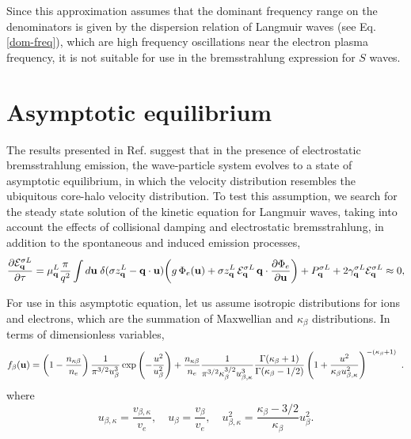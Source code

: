 \documentclass[12pt,a4paper,ruledheader]{report}
\begin{document}
\begin{appendix}
Since this approximation assumes that the dominant frequency range on
the denominators is given by the dispersion relation of Langmuir waves
(see Eq. \eqref{dom-freq}), which are high frequency oscillations
near the electron plasma frequency, it is not suitable for use in
the bremsstrahlung expression for $S$ waves.


\chapter{Asymptotic equilibrium}
\label{appB}
The results presented in Ref. \cite{Tigik2017a} suggest that in the presence
of electrostatic bremsstrahlung emission, the wave-particle system evolves to
a state of asymptotic equilibrium, in which the velocity distribution resembles
the ubiquitous core-halo velocity distribution. To test this assumption, we
search for the steady state solution of the kinetic equation for Langmuir waves,
taking into account the effects of collisional damping and electrostatic
bremsstrahlung, in addition to the spontaneous and induced emission processes,
\begin{equation}
  \frac{\partial {\cal E}_{\bf q}^{\sigma L}}
  {\partial \tau}
  =\mu_{\bf q}^L\frac{\pi}{q^2}
  \int d{\bf u}\;\delta(\sigma
  z_{\bf q}^L-{\bf q}\cdot{\bf u})\biggl(g\,\Phi_e({\bf u})
  +\sigma z_{\bf q}^L\,{\cal E}_{\bf q}^{\sigma L}
  \,{\bf q}\cdot\frac{\partial \Phi_e}{\partial{\bf u}}\biggr)
  +P_{\bf q}^{\sigma L}+2\gamma_{\bf q}^{\sigma L}{\cal E}_{\bf q}^{\sigma L}\approx 0,
  \label{asymp}
\end{equation}

For use in this asymptotic equation, let us assume isotropic distributions for
ions and electrons, which are the summation of Maxwellian and $\kappa_\beta$
distributions. In terms of dimensionless variables,
\begin{equation}
\label{fbeta}
f_{\beta}({\bf u})= \left(1-\frac{n_{\kappa\beta}}{n_e}\right)
\frac{1}{\pi^{3/2} u_{\beta}^3}\exp\left(-\frac{u^2}{u_\beta^2}\right)
+\frac{n_{\kappa\beta}}{n_e}\frac{1}{\pi^{3/2} \kappa_\beta^{3/2}
u_{\beta,\kappa}^3}
\frac{\Gamma(\kappa_\beta+1)}{\Gamma(\kappa_\beta-1/2)}
\left(1+\frac{u^2}{\kappa_\beta u_{\beta,\kappa}^2}
\right)^{-(\kappa_\beta+1)}~.
\end{equation}
where
\begin{equation}
u_{\beta,\kappa}= \frac{v_{\beta,\kappa}}{v_e},\quad
u_\beta=\frac{v_\beta}{v_e},\quad
u_{\beta,\kappa}^2= \frac{\kappa_\beta-3/2}{\kappa_\beta} u_\beta^2.
\end{equation}


\end{appendix}
\end{document}
